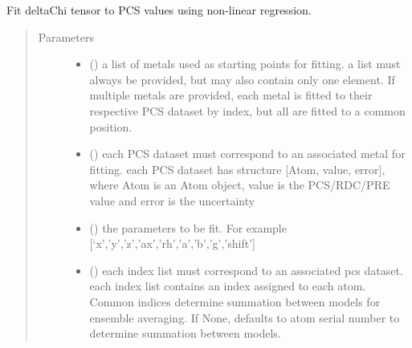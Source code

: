 \documentclass[a4paper,10pt,english,openany,oneside]{sphinxmanual}
\begin{document}
\begin{fulllineitems}
\label{\detokenize{reference/generated/paramagpy.fit.nlr_fit_metal_from_pcs:paramagpy.fit.nlr_fit_metal_from_pcs}}
Fit deltaChi tensor to PCS values using non-linear regression.
\begin{quote}\begin{description}
\item[{Parameters}] \leavevmode\begin{itemize}
\item {} 
 () \textendash{} a list of metals used as starting points for fitting.
a list must always be provided, but may also contain
only one element. If multiple metals are provided, each metal
is fitted to their respective PCS dataset by index, but all are
fitted to a common position.

\item {} 
 () \textendash{} each PCS dataset must correspond to an associated metal for fitting.
each PCS dataset has structure {[}Atom, value, error{]}, where Atom is
an Atom object, value is the PCS/RDC/PRE value
and error is the uncertainty

\item {} 
 () \textendash{} the parameters to be fit.
For example {[}‘x’,’y’,’z’,’ax’,’rh’,’a’,’b’,’g’,’shift’{]}

\item {} 
 (\sphinxstyleliteralemphasis{\sphinxupquote{, }}) \textendash{} each index list must correspond to an associated pcs dataset.
each index list contains an index assigned to each atom.
Common indices determine summation between models
for ensemble averaging.
If None, defaults to atom serial number to determine summation
between models.


\end{itemize}
\end{description}
\end{quote}
\end{fulllineitems}
\end{document}
